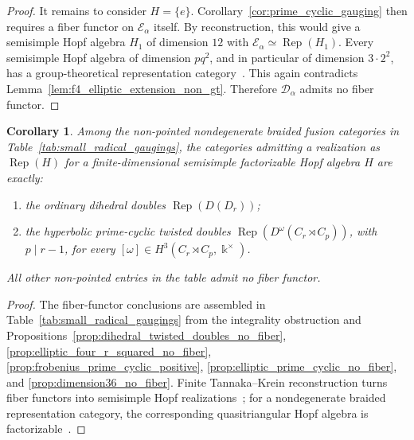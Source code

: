 \documentclass[12pt]{amsart}
\theoremstyle{plain}
\newtheorem{corollary}[theorem]{Corollary}
\theoremstyle{definition} %
\theoremstyle{remark} %
\newcommand{\ku}{{\Bbbk}} %
\newcommand{\cD}{\mathcal{D}}
\newcommand{\cE}{\mathcal{E}}
\newcommand{\Rep}{\operatorname{Rep}}
\begin{document}
\begin{proof}
It remains to consider $H=\{e\}$. Corollary~\ref{cor:prime_cyclic_gauging} then requires a fiber functor on $\cE_\alpha$ itself. By reconstruction, this would give a semisimple Hopf algebra $H_1$ of dimension $12$ with $\cE_\alpha\simeq\Rep(H_1)$. Every semisimple Hopf algebra of dimension $pq^2$, and in particular of dimension $3\cdot2^2$, has a group-theoretical representation category~\cite[Corollary~1.2]{JL09}. This again contradicts Lemma~\ref{lem:f4_elliptic_extension_non_gt}. Therefore $\cD_\alpha$ admits no fiber functor.
\end{proof}


\begin{corollary}\label{cor:factorizable_hopf_realizations}
Among the non-pointed nondegenerate braided fusion categories in
Table~\ref{tab:small_radical_gaugings}, the categories admitting a
realization as \(\Rep(H)\) for a finite-dimensional semisimple factorizable
Hopf algebra \(H\) are exactly:
\begin{enumerate}
\item the ordinary dihedral doubles \(\Rep(D(D_r))\);
\item the hyperbolic prime-cyclic twisted doubles
\(\Rep(D^\omega(C_r\rtimes C_p))\), with \(p\mid r-1\), for every
\([\omega]\in H^3(C_r\rtimes C_p,\ku^\times)\).
\end{enumerate}
All other non-pointed entries in the table admit no fiber functor.
\end{corollary}

\begin{proof}
The fiber-functor conclusions are assembled in
Table~\ref{tab:small_radical_gaugings} from the integrality obstruction and
Propositions~\ref{prop:dihedral_twisted_doubles_no_fiber},
\ref{prop:elliptic_four_r_squared_no_fiber},
\ref{prop:frobenius_prime_cyclic_positive},
\ref{prop:elliptic_prime_cyclic_no_fiber}, and
\ref{prop:dimension36_no_fiber}. Finite Tannaka--Krein reconstruction turns
fiber functors into semisimple Hopf realizations~\cite[Theorem~5.3.12]{EGNO15};
for a nondegenerate braided representation category, the corresponding
quasitriangular Hopf algebra is factorizable~\cite[Chapter~VIII]{Kas95}.
\end{proof}



\end{document}
